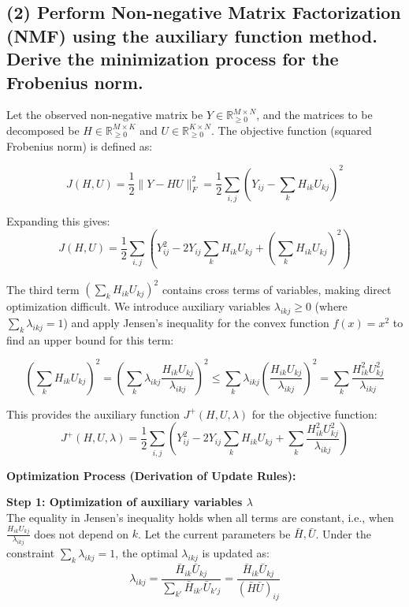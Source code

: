 \documentclass[12pt,a4paper]{article}
\begin{document}
\subsection*{(2) Perform Non-negative Matrix Factorization (NMF) using the auxiliary function method. Derive the minimization process for the Frobenius norm.}

Let the observed non-negative matrix be $Y \in \mathbb{R}_{\geq 0}^{M \times N}$, and the matrices to be decomposed be $H \in \mathbb{R}_{\geq 0}^{M \times K}$ and $U \in \mathbb{R}_{\geq 0}^{K \times N}$. The objective function (squared Frobenius norm) is defined as:

\begin{equation}
J(H, U) = \frac{1}{2} \|Y - HU\|_F^2 = \frac{1}{2} \sum_{i,j} \left( Y_{ij} - \sum_k H_{ik}U_{kj} \right)^2
\end{equation}

Expanding this gives:
\begin{equation}
J(H, U) = \frac{1}{2} \sum_{i,j} \left( Y_{ij}^2 - 2 Y_{ij} \sum_k H_{ik}U_{kj} + \left(\sum_k H_{ik}U_{kj}\right)^2 \right)
\end{equation}

The third term $\left(\sum_k H_{ik}U_{kj}\right)^2$ contains cross terms of variables, making direct optimization difficult. We introduce auxiliary variables $\lambda_{ikj} \ge 0$ (where $\sum_k \lambda_{ikj} = 1$) and apply Jensen's inequality for the convex function $f(x) = x^2$ to find an upper bound for this term:

\begin{equation}
\left( \sum_k H_{ik}U_{kj} \right)^2 = \left( \sum_k \lambda_{ikj} \frac{H_{ik}U_{kj}}{\lambda_{ikj}} \right)^2 \leq \sum_k \lambda_{ikj} \left( \frac{H_{ik}U_{kj}}{\lambda_{ikj}} \right)^2 = \sum_k \frac{H_{ik}^2 U_{kj}^2}{\lambda_{ikj}}
\end{equation}

This provides the auxiliary function $J^+(H, U, \lambda)$ for the objective function:
\begin{equation}
J^+(H, U, \lambda) = \frac{1}{2} \sum_{i,j} \left( Y_{ij}^2 - 2 Y_{ij} \sum_k H_{ik}U_{kj} + \sum_k \frac{H_{ik}^2 U_{kj}^2}{\lambda_{ikj}} \right)
\end{equation}

\textbf{Optimization Process (Derivation of Update Rules):}

\textbf{Step 1: Optimization of auxiliary variables $\lambda$} \\
The equality in Jensen's inequality holds when all terms are constant, i.e., when $\frac{H_{ik}U_{kj}}{\lambda_{ikj}}$ does not depend on $k$. Let the current parameters be $\bar{H}, \bar{U}$. Under the constraint $\sum_k \lambda_{ikj} = 1$, the optimal $\lambda_{ikj}$ is updated as:
\begin{equation}
\lambda_{ikj} = \frac{\bar{H}_{ik}\bar{U}_{kj}}{\sum_{k'} \bar{H}_{ik'}\bar{U}_{k'j}} = \frac{\bar{H}_{ik}\bar{U}_{kj}}{(\bar{H}\bar{U})_{ij}}
\end{equation}
\end{document}
